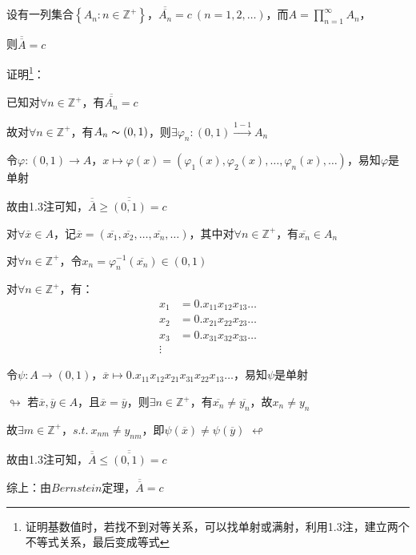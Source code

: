 \begin{td}
设有一列集合$\left\{A_{n} : n \in \mathbb{Z}^{+}\right\} $，$\overline{\overline{A_{n}} } = c \ \left(n = 1,2,\dots\right) $，而$A = \prod \limits_{n=1}^{\infty}A_{n}$，
\par \quad \quad \quad \quad 则$\overline{\overline{A}} = c$    
\end{td}
\noindent 证明\footnote{证明基数值时，若找不到对等关系，可以找单射或满射，利用1.3注，建立两个不等式关系，最后变成等式}：
\par {} 已知对$\forall n \in \mathbb{Z}^{+}$，有$\overline{\overline{A_{n}} } = c$
\par \quad 故对$\forall n \in \mathbb{Z}^{+}$，有$A_{n} \thicksim \left(0,1\right) $，则$\exists \varphi_{n} : \left(0,1\right) \stackrel{1-1}{\to} A_{n}$
\par \quad 令$\varphi : \left(0,1\right) \to A$，$x \mapsto \varphi (x) = \left(\varphi _{1}(x),\varphi _{2}(x),\dots,\varphi _{n}(x),\dots\right) $，易知$\varphi$是单射
\par \quad 故由1.3注可知，$\overline{\overline{A}} \geqslant \overline{\overline{\left(0,1\right)}} = c$
\par {} 对$\forall \overline{x} \in A$，记$\overline{x} = \left(\overline{x_{1}} ,\overline{x_{2}}, \dots,\overline{x_{n}} , \dots\right)$，其中对$\forall n \in \mathbb{Z}^{+}$，有$\overline{x_{n}} \in A_{n} $
\par \quad 对$\forall n \in \mathbb{Z}^{+}$，令$x_{n} = \varphi^{-1}_{n}\left(\overline{x_{n}}\right) \in \left(0,1\right) $ 
\par \quad 对$\forall n \in \mathbb{Z}^{+}$，有：
\begin{align*}
    x_{1} & = 0.x_{11}x_{12}x_{13}\dots \\
    x_{2} & = 0.x_{21}x_{22}x_{23}\dots \\
    x_{3} & = 0.x_{31}x_{32}x_{33}\dots \\
    \vdots
\end{align*}
\par \quad 令$\psi : A \to \left(0,1\right) $，$\overline{x} \mapsto 0.x_{11}x_{12}x_{21}x_{31}x_{22}x_{13} \dots$，易知$\psi$是单射
\par \quad $\looparrowright$ 若$\overline{x} , \overline{y} \in A $，且$\overline{x} = \overline{y}$，则$\exists n \in \mathbb{Z}^{+}$，有$\overline{x_{n}} \neq \overline{y_{n}}$，故$x_{n} \neq y_{n}$
\par \quad \quad 故$\exists m \in \mathbb{Z}^{+}$，$s.t. \ x_{nm} \neq y_{nm}$，即$\psi \left(\overline{x} \right) \neq \psi \left(\overline{y} \right)$ \quad \quad \quad \quad \quad$\looparrowleft $
\par \quad 故由1.3注可知，$\overline{\overline{A}} \leqslant \overline{\overline{\left(0,1\right)}} = c$
\par 综上：由$Bernstein$定理，$\overline{\overline{A}} = c$


